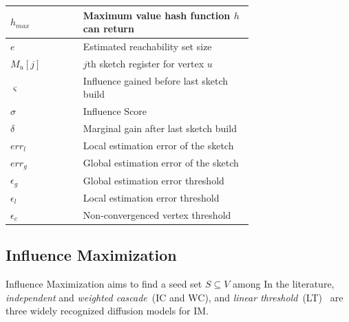 \begin{table}[!ht]
\begin{small}
\begin{tabular}{|l|p{0.7\linewidth}|}
        $h_{max}$       & Maximum value hash function $h$ can return\\
        \hline\hline
        $e$             & Estimated reachability set size\\
        $M_u[j]$        & $j$th sketch register for vertex $u$\\
        $\varsigma $    & Influence gained before last sketch build\\
        $\sigma $       & Influence Score\\
        $\delta$        & Marginal gain after last sketch build\\
        $err_l$         & Local estimation error of the sketch\\
        $err_g$         & Global estimation error of the sketch\\
        $\epsilon_{g}$    & Global estimation error threshold\\
        $\epsilon_{l}$    & Local estimation error threshold\\ 
        $\epsilon_{c}$    & Non-convergenced vertex threshold\\
        \hline         
    \end{tabular}
    \end{small}
\end{table}
\subsection{Influence Maximization}

Influence Maximization aims to find a seed set $S \subseteq V$ among  %
In the literature, {\em independent} and {\em weighted cascade}~(IC and WC), and 
{\em linear threshold}~(LT)~\cite{kempe2003maximizing} are three widely recognized diffusion models for IM. 

